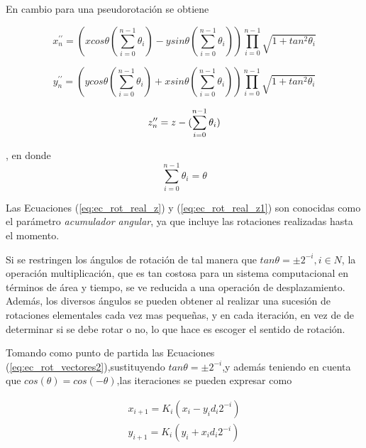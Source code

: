 En cambio para una pseudorotación se obtiene

\begin{equation}\label{eq:ec_rot_real_x1}
     x^{\prime\prime}_{n} = (xcos\theta(\sum_{i=0}^{n-1}\theta_{i}) - ysin\theta(\sum_{i=0}^{n-1}\theta_{i}))\prod_{i=0}^{n-1}\sqrt{1 + tan^{2}\theta_{i}}
\end{equation}

\begin{equation}\label{eq:ec_rot_real_y1}
     y^{\prime\prime}_{n} = (ycos\theta(\sum_{i=0}^{n-1}\theta_{i}) + xsin\theta(\sum_{i=0}^{n-1}\theta_{i}))\prod_{i=0}^{n-1}\sqrt{1 + tan^{2}\theta_{i}}
\end{equation}

\begin{equation}\label{eq:ec_rot_real_z1}
	z^{\prime\prime}_{n} = z - (\sum_{i=0}^{n-1}\theta_{i})\\
\end{equation}

, en donde \[\sum_{i=0}^{n-1}\theta_{i} = \theta\]

Las Ecuaciones (\ref{eq:ec_rot_real_z}) y (\ref{eq:ec_rot_real_z1}) son conocidas como el parámetro \textit{acumulador angular}, ya que incluye las rotaciones realizadas hasta el momento.

Si se restringen los ángulos de rotación de tal manera que $tan\theta = \pm2^{-i}, i\in N$, la operación multiplicación, que es tan costosa para un sistema computacional en términos de área y  tiempo, se ve reducida a una operación de desplazamiento. Además, los diversos ángulos se pueden obtener al realizar una sucesión de rotaciones elementales cada vez mas pequeñas, y en cada iteración, en vez de de determinar si se debe rotar o no, lo que hace es escoger el sentido de rotación.

Tomando como punto de partida las Ecuaciones (\ref{eq:ec_rot_vectores2}),sustituyendo $tan\theta = \pm2^{-i}$,y además teniendo en cuenta que $cos(\theta) =  cos(-\theta)$,las iteraciones se pueden expresar como


\begin{equation}\label{eq:ec_rot_vectores_4}
\begin{array}{l}
     x_{i+1} = K_{i}(x_{i} - y_{i}d_{i}2^{-i})\\
     y_{i+1} = K_{i}(y_{i} + x_{i}d_{i}2^{-i})\\
\end{array}
\end{equation}

